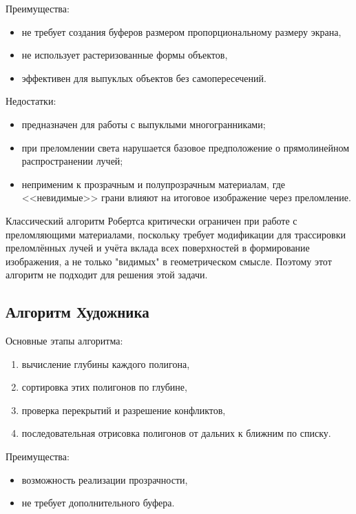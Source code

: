 Преимущества:

\begin{itemize}
	\item не требует создания буферов размером пропорциональному размеру экрана,
	\item не использует растеризованные формы объектов,
	\item эффективен для выпуклых объектов без самопересечений.
\end{itemize}

Недостатки:

\begin{itemize}
	\item предназначен для работы с выпуклыми многогранниками;
	\item при преломлении света нарушается базовое предположение о прямолинейном распространении лучей;
	\item неприменим к прозрачным и полупрозрачным материалам, где <<невидимые>> грани влияют на итоговое изображение через преломление.
\end{itemize}

Классический алгоритм Робертса критически ограничен при работе с преломляющими материалами, поскольку требует модификации для трассировки преломлённых лучей и учёта вклада всех поверхностей в формирование изображения, а не только "видимых" в геометрическом смысле. Поэтому этот алгоритм не подходит для решения этой задачи.

\subsection{Алгоритм Художника}

Основные этапы алгоритма:
\begin{enumerate}
	\item вычисление глубины каждого полигона,
	\item сортировка этих полигонов по глубине,
	\item проверка перекрытий и разрешение конфликтов,
	\item последовательная отрисовка полигонов от дальних к ближним по списку.
\end{enumerate}

Преимущества:

\begin{itemize}
	\item возможность реализации прозрачности,
	\item не требует дополнительного буфера.
\end{itemize}

